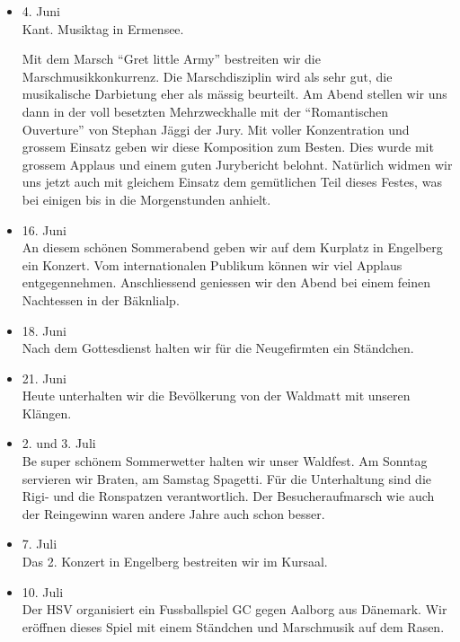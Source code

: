 \begin{history}
\begin{itemize}
        \item 4. Juni\\
              Kant. Musiktag in Ermensee.

              Mit dem Marsch \enquote{Gret little Army}
              bestreiten wir die Marschmusikkonkurrenz. Die Marschdisziplin wird als
              sehr gut, die musikalische Darbietung eher als mässig beurteilt. Am
              Abend stellen wir uns dann in der voll besetzten Mehrzweckhalle mit der
              \enquote{Romantischen Ouverture} von Stephan Jäggi der Jury. Mit voller
              Konzentration und grossem Einsatz geben wir diese Komposition zum
              Besten. Dies wurde mit grossem Applaus und einem guten Jurybericht
              belohnt. Natürlich widmen wir uns jetzt auch mit gleichem Einsatz dem
              gemütlichen Teil dieses Festes, was bei einigen bis in die Morgenstunden
              anhielt.

        \item 16. Juni\\
              An diesem schönen Sommerabend geben wir auf dem Kurplatz in Engelberg
              ein Konzert. Vom internationalen Publikum können wir viel Applaus
              entgegennehmen. Anschliessend geniessen wir den Abend bei einem feinen
              Nachtessen in der Bäknlialp.

        \item 18. Juni\\
              Nach dem Gottesdienst halten wir für die Neugefirmten ein Ständchen.

        \item 21. Juni\\
              Heute unterhalten wir die Bevölkerung von der Waldmatt mit unseren
              Klängen.

        \item 2. und 3. Juli\\
              Be super schönem Sommerwetter halten wir unser Waldfest. Am Sonntag
              servieren wir Braten, am Samstag Spagetti. Für die Unterhaltung sind die
              Rigi- und die Ronspatzen verantwortlich. Der Besucheraufmarsch wie auch
              der Reingewinn waren andere Jahre auch schon besser.

        \item 7. Juli\\
              Das 2. Konzert in Engelberg bestreiten wir im Kursaal.

        \item 10. Juli\\
              Der HSV organisiert ein Fussballspiel GC gegen Aalborg aus Dänemark. Wir
              eröffnen dieses Spiel mit einem Ständchen und Marschmusik auf dem Rasen.


\end{itemize}
\end{history}
